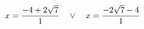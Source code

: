 \documentclass[preview]{standalone}
\begin{document}
\begin{align*}
\special{dvisvgm:raw <g id='unique000'>}x=\frac{-4 + 2 \sqrt{7}}{1} \quad \lor \quad x=\frac{- 2 \sqrt{7} - 4}{1}\special{dvisvgm:raw </g>}
\end{align*}
\end{document}

